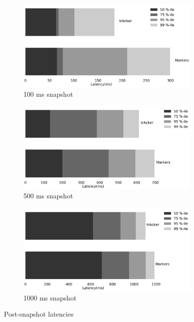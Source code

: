 \begin{figure}[t!]
    \begin{subfigure}[b]{0.32\textwidth}
            \includegraphics[width=0.99\textwidth]{pics/buffering_latencies_barh_100.png}
            \caption{100 ms snapshot}
    \end{subfigure}
    \hspace{5mm}
    \begin{subfigure}[b]{0.32\textwidth}
            \includegraphics[width=0.99\textwidth]{pics/buffering_latencies_barh_500.png}
            \caption{500 ms snapshot}
    \end{subfigure}
    \hspace{5mm}
    \begin{subfigure}[b]{0.32\textwidth}
            \includegraphics[width=0.99\textwidth]{pics/buffering_latencies_barh_1000.png}
            \caption{1000 ms snapshot}
    \end{subfigure}
    \caption{Post-snapshot latencies}
\end{figure}

